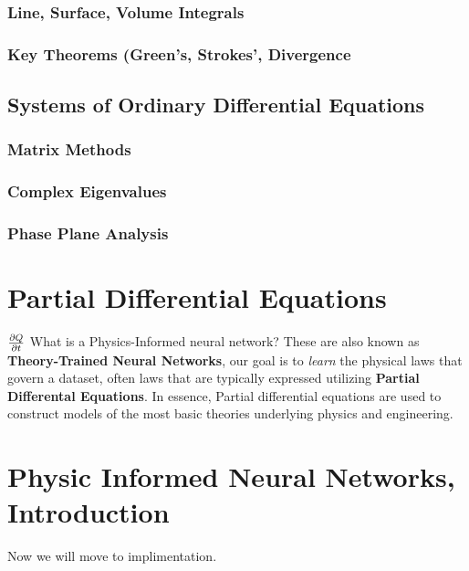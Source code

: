 \documentclass[10pt, oneside]{report}
\begin{document}
\subsection{Line, Surface, Volume Integrals} 
\subsection{Key Theorems (Green's, Strokes', Divergence}

\section{Systems of Ordinary Differential Equations}
\subsection{Matrix Methods}
\subsection{Complex Eigenvalues}
\subsection{Phase Plane Analysis}

\chapter{Partial Differential Equations}
$\pdv{Q}{t}$
What is a Physics-Informed neural network? These are also known as \textbf{Theory-Trained Neural Networks}, our goal is to \textit{learn} the physical laws that govern a dataset, often laws that are typically expressed utilizing \textbf{Partial Differental Equations}.  
In essence, Partial differential equations are used to construct models of the most basic theories underlying physics and engineering.  


\chapter{Physic Informed Neural Networks, Introduction}
Now we will move to implimentation.  
\end{document}
